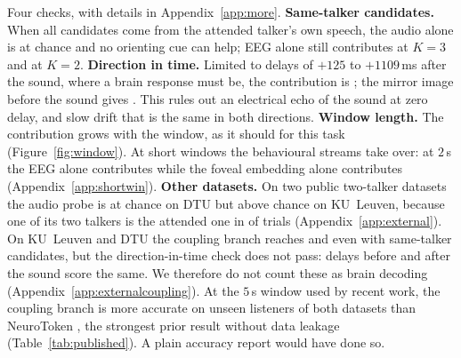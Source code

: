 Four checks, with details in Appendix~\ref{app:more}.
\textbf{Same-talker candidates.} When all candidates come from the attended
talker's own speech, the audio alone is at chance and no orienting cue can help;
EEG alone still contributes  at $K\!=\!3$ and
 at $K\!=\!2$.
\textbf{Direction in time.} Limited to delays of $+125$ to $+1109$\,ms after the
sound, where a brain response must be, the contribution is
; the mirror image before the sound gives
. This rules out an electrical echo of the sound
at zero delay, and slow drift that is the same in both directions.
\textbf{Window length.} The contribution grows with the window, as it should for
this task \citep{geirnaert2021} (Figure~\ref{fig:window}). At short windows the
behavioural streams take over: at $2$\,s the EEG alone contributes
 while the foveal embedding alone contributes
 (Appendix~\ref{app:shortwin}).
\textbf{Other datasets.} On two public two-talker datasets the audio probe is at
chance on DTU but  above chance on KU~Leuven,
because one of its two talkers is the attended one in  of  trials
(Appendix~\ref{app:external}). On KU~Leuven and DTU the coupling branch reaches
 and 
even with same-talker candidates, but the direction-in-time check does not pass:
delays before and after the sound score the same. We therefore do not count these
as brain decoding (Appendix~\ref{app:externalcoupling}). At the $5$\,s window used by recent work,
the coupling branch is more accurate on unseen listeners of both datasets than
NeuroToken \citep{alavi2026neurotoken}, the strongest prior result without data
leakage (Table~\ref{tab:published}). A plain accuracy report
would have done so.
